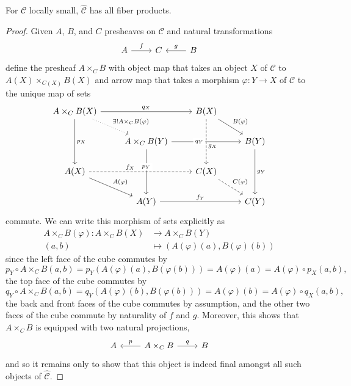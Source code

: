 \documentclass[dissertation.tex]{subfiles}
\begin{document}
\begin{prop}
  For $\mathscr{C}$ locally small, $\hat{\mathscr{C}}$ has all fiber products.
  
  \begin{proof}
    Given $A$, $B$, and $C$ presheaves on $\mathscr{C}$ and natural transformations
    $$\begin{tikzcd}A \arrow{r}{f} & C & B \arrow[swap]{l}{g}\end{tikzcd}$$
    define the presheaf $A \times_C B$ with object map that takes an object $X$ of $\mathscr{C}$ to $A(X) \times_{C(X)} B(X)$ and arrow map that takes a morphism $\varphi : Y \rightarrow X$ of $\mathscr{C}$ to the unique map of sets
    $$\begin{tikzcd}
      A \times_{C} B(X) \arrow{rr}{q_X}\arrow{dd}{p_X} \arrow[dotted]{rd}{\exists !A \times_C B (\varphi)}& & B(X)\arrow[dashed]{dd}[pos=0.6]{g_X}\arrow{rd}{B(\varphi)}&\\
      & A \times_{C} B(Y)\arrow{dd}[description, pos=0.39]{p_Y} \arrow{rr}[pos=0.4,description]{q_Y} & & B(Y)\arrow{dd}{g_Y}\\
      A(X)\arrow{rd}{A(\varphi)}\arrow[dashed]{rr}[pos=0.4]{f_X} & & C(X)\arrow[dashed]{rd}{C(\varphi)} & \\
      & A(Y)\arrow{rr}{f_Y} & & C(Y)
    \end{tikzcd}$$
    commute.
    We can write this morphism of sets explicitly as
    \begin{align*}
      A \times_C B(\varphi) \colon A \times_C B(X) &\rightarrow A \times_C B (Y)\\
      (a,b) &\mapsto (A(\varphi)(a), B(\varphi)(b))
    \end{align*}
    since the left face of the cube commutes by
    $$p_Y \circ A \times_C B(a,b)  = p_Y(A(\varphi)(a), B(\varphi(b))) = A(\varphi)(a) = A(\varphi) \circ p_X(a,b),$$
    the top face of the cube commutes by
    $$q_Y \circ A \times_C B(a,b)  = q_Y(A(\varphi)(b), B(\varphi(b))) = A(\varphi)(b) = A(\varphi) \circ q_X(a,b),$$
    the back and front faces of the cube commutes by assumption, and the other two faces of the cube commute by naturality of $f$ and $g$.
    Moreover, this shows that $A \times_C B$ is equipped with two natural projections,
    $$\begin{tikzcd}
      A & A \times_C B \arrow{r}{q} \arrow[swap]{l}{p} & B
    \end{tikzcd}$$
    and so it remains only to show that this object is indeed final amongst all such objects of $\hat{\mathscr{C}}$.


\end{proof}
\end{prop}
\end{document}
